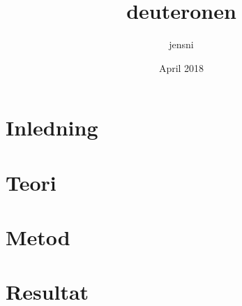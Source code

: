 \documentclass{article}
\title{deuteronen}
\author{jensni }
\date{April 2018}
\begin{document}


\begin{multicols}{2}
\section{Inledning}


\section{Teori}


\section{Metod}


\section{Resultat}





\end{multicols}


\end{document}
